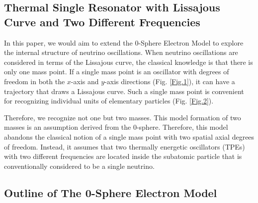 \documentclass[%
 reprint,
 amsmath,amssymb,
 aps,
]{revtex4-1}
\numberwithin{equation}{section}%
\begin{document}



\subsection{Thermal Single Resonator with Lissajous Curve and Two Different Frequencies}


In this paper, we would aim to extend the 0-Sphere Electron Model to explore the internal structure of neutrino oscillations. When neutrino oscillations are considered in terms of the Lissajous curve, the classical knowledge is that there is only one mass point. If a single mass point is an oscillator with degrees of freedom in both the $x$-axis and $y$-axis directions (Fig. \ref{Fig.1}), it can have a trajectory that draws a Lissajous curve. Such a single mass point is convenient for recognizing individual units of elementary particles (Fig. \ref{Fig.2}).

Therefore, we recognize not one but two masses. This model formation of two masses is an assumption derived from the 0-sphere. Therefore, this model abandons the classical notion of a single mass point with two spatial axial degrees of freedom. Instead, it assumes that two thermally energetic oscillators (TPEs) with two different frequencies are located inside the subatomic particle that is conventionally considered to be a single neutrino.


\subsection{Outline of The 0-Sphere Electron Model}
\end{document}
